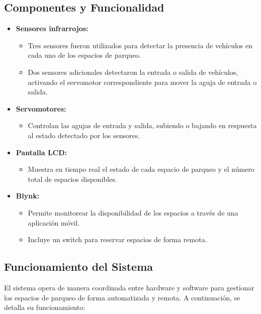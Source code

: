 \documentclass[12pt,a4paper]{article}
\begin{document}
\subsection{Componentes y Funcionalidad}
\begin{itemize}
    \item \textbf{Sensores infrarrojos:}
    \begin{itemize}
        \item Tres sensores fueron utilizados para detectar la presencia de vehículos en cada uno de los espacios de parqueo.
        \item Dos sensores adicionales detectaron la entrada o salida de vehículos, activando el servomotor correspondiente para mover la aguja de entrada o salida.
    \end{itemize}

    \item \textbf{Servomotores:}
    \begin{itemize}
        \item Controlan las agujas de entrada y salida, subiendo o bajando en respuesta al estado detectado por los sensores.
    \end{itemize}

    \item \textbf{Pantalla LCD:}
    \begin{itemize}
        \item Muestra en tiempo real el estado de cada espacio de parqueo y el número total de espacios disponibles.
    \end{itemize}

    \item \textbf{Blynk:}
    \begin{itemize}
        \item Permite monitorear la disponibilidad de los espacios a través de una aplicación móvil.
        \item Incluye un switch para reservar espacios de forma remota.
    \end{itemize}
\end{itemize}

\subsection{Funcionamiento del Sistema}
El sistema opera de manera coordinada entre hardware y software para gestionar los espacios de parqueo de forma automatizada y remota. A continuación, se detalla su funcionamiento:
\end{document}
